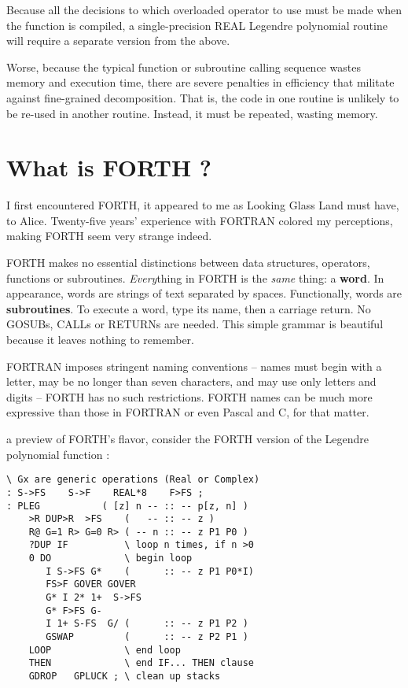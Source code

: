 Because all the decisions to which overloaded operator to use must be made when the function is compiled, a single-precision REAL Legendre polynomial routine will require a separate version from the above.

Worse, because the typical function or subroutine calling sequence wastes memory and execution time, there are severe penalties in efficiency that militate against fine-grained decomposition. That is, the code in one routine is unlikely to be re-used in another routine. Instead, it must be repeated, wasting memory. 

\section{What is FORTH ?}
 I first encountered FORTH, it appeared to me as Looking Glass Land must have, to Alice. Twenty-five years' experience with FORTRAN colored my perceptions, making FORTH seem very strange indeed.

FORTH makes no essential distinctions between data structures, operators, functions or subroutines. \textit{Every}thing in FORTH is the \textit{same} thing: a \textbf{word}. In appearance, words are strings of text separated by spaces. Functionally, words are \textbf{subroutines}. To execute a word, type its name, then a carriage return. No GOSUBs, CALLs or RETURNs are needed. This simple grammar is beautiful because it leaves nothing to remember.

FORTRAN imposes stringent naming conventions -- names must begin with a letter, may be no longer than seven characters, and may use only letters and digits -- FORTH has no such restrictions. FORTH names can be much more expressive than those in FORTRAN or even Pascal and C, for that matter.

 a preview of FORTH's flavor, consider the FORTH version of the Legendre polynomial function :

\begin{lstlisting}
\ Gx are generic operations (Real or Complex)
: S->FS    S->F    REAL*8    F>FS ;
: PLEG           ( [z] n -- :: -- p[z, n] )
    >R DUP>R  >FS    (   -- :: -- z )
    R@ G=1 R> G=0 R> ( -- n :: -- z P1 P0 )
    ?DUP IF          \ loop n times, if n >0
    0 DO             \ begin loop
       I S->FS G*    (      :: -- z P1 P0*I)
       FS>F GOVER GOVER
       G* I 2* 1+  S->FS
       G* F>FS G-
       I 1+ S-FS  G/ (      :: -- z P1 P2 )
       GSWAP         (      :: -- z P2 P1 )
    LOOP             \ end loop
    THEN             \ end IF... THEN clause
    GDROP   GPLUCK ; \ clean up stacks
\end{lstlisting}

